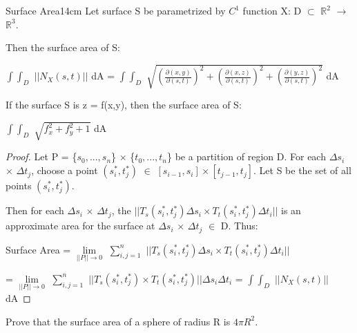     \begin{wtheorem}{Surface Area}{14cm}
        Let surface S be parametrized by $C^1$ function X:
        D $\subset$ $\mathbb{R}^2$ $\rightarrow$ $\mathbb{R}^3$.
        
        Then the surface area of S:

        \hspace{0.5cm}
        $\int \int_D$ $|| N_X(s,t) ||$ dA
        = $\int \int_D$ $\sqrt{(\frac{\partial(x,y)}{\partial(s,t)})^2
                                + (\frac{\partial(x,z)}{\partial(s,t)})^2
                                + (\frac{\partial(y,z)}{\partial(s,t)})^2}$ dA

        If the surface S is z = f(x,y), then the surface area of S:

        \hspace{0.5cm}
        $\int \int_D$ $\sqrt{f_x^2 + f_y^2 + 1}$ dA
    \end{wtheorem}

    \begin{proof}
        Let P = \{$s_0,...,s_n$\} $\times$ \{$t_0,...,t_n$\}
        be a partition of region D.
        For each $\Delta s_i$ $\times$ $\Delta t_j$, choose
        a point $(s_i^*,t_j^*)$ $\in$ $[s_{i-1},s_i] \times [t_{j-1},t_j]$.
        Let S be the set of all points $(s_i^*,t_j^*)$.

        Then for each $\Delta s_i$ $\times$ $\Delta t_j$,
        the $||T_s(s_i^*,t_j^*)\Delta s_i \times T_t(s_i^*,t_j^*)\Delta t_i||$
        is an approximate area for the surface at
        $\Delta s_i$ $\times$ $\Delta t_j$ $\in$ D.
        Thus:

        \hspace{0.5cm}
        Surface Area
        = $\underset{||P|| \rightarrow 0}{\lim}$ $\sum_{i,j=1}^n$
            $||T_s(s_i^*,t_j^*)\Delta s_i \times T_t(s_i^*,t_j^*)\Delta t_i||$

        \hspace{2.9cm}
        = $\underset{||P|| \rightarrow 0}{\lim}$ $\sum_{i,j=1}^n$
            $||T_s(s_i^*,t_j^*) \times T_t(s_i^*,t_j^*)||\Delta s_i\Delta t_i$
        = $\int \int_D$ $|| N_X(s,t) ||$ dA
    \end{proof}

    \vspace{0.5cm}



    \begin{example}
        Prove that the surface area of a sphere of radius R is $4\pi R^2$.
    \end{example}

